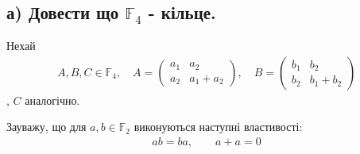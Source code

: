 \documentclass[11pt, a4paper]{article} %
\newcommand{\F}{\mathbb{F}}
\begin{document}
\subsection*{а) Довести що $\F_4$ - кільце.}
Нехай 
\begin{gather*}
    A,B,C \in \F_4, \quad 
    A = \begin{pmatrix}
        a_1 & a_2\\ a_2 & a_1 + a_2
    \end{pmatrix}, \quad
    B = \begin{pmatrix}
        b_1 & b_2 \\ b_2 & b_1 + b_2
    \end{pmatrix}
\end{gather*}, $C$ аналогічно.

Зауважу, що для $a,b\in\F_2$ виконуються наступні властивості:
\begin{gather*}
    ab = ba,\qquad a+a = 0
\end{gather*}
\end{document}
